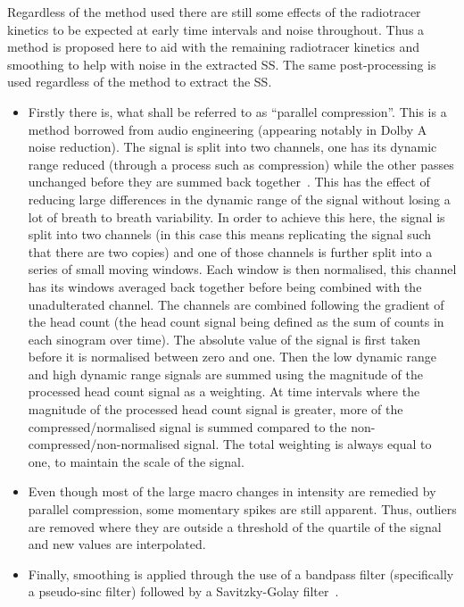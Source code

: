                 Regardless of the method used there are still some effects of the radiotracer kinetics to be expected at early time intervals and noise throughout. Thus a method is proposed here to aid with the remaining radiotracer kinetics and smoothing to help with noise in the extracted \gls{SS}. The same post-processing is used regardless of the method to extract the \gls{SS}.
                    
                \begin{itemize}
                    \item Firstly there is, what shall be referred to as ``parallel compression''. This is a method borrowed from audio engineering (appearing notably in Dolby A noise reduction). The signal is split into two channels, one has its dynamic range reduced (through a process such as compression) while the other passes unchanged before they are summed back together~\parencite{Izhaki2012MixingTools}. This has the effect of reducing large differences in the dynamic range of the signal without losing a lot of breath to breath variability. In order to achieve this here, the signal is split into two channels (in this case this means replicating the signal such that there are two copies) and one of those channels is further split into a series of small moving windows. Each window is then normalised, this channel has its windows averaged back together before being combined with the unadulterated channel. The channels are combined following the gradient of the head count (the head count signal being defined as the sum of counts in each sinogram over time). The absolute value of the signal is first taken before it is normalised between zero and one. Then the low dynamic range and high dynamic range signals are summed using the magnitude of the processed head count signal as a weighting. At time intervals where the magnitude of the processed head count signal is greater, more of the compressed/normalised signal is summed compared to the non-compressed/non-normalised signal. The total weighting is always equal to one, to maintain the scale of the signal.
                        
                    \item Even though most of the large macro changes in intensity are remedied by parallel compression, some momentary spikes are still apparent. Thus, outliers are removed where they are outside a threshold of the quartile of the signal and new values are interpolated.
                        
                    \item Finally, smoothing is applied through the use of a bandpass filter (specifically a pseudo-sinc filter) followed by a Savitzky-Golay filter~\parencite{Savitzky1964SmoothingProcedures}.
                \end{itemize}

